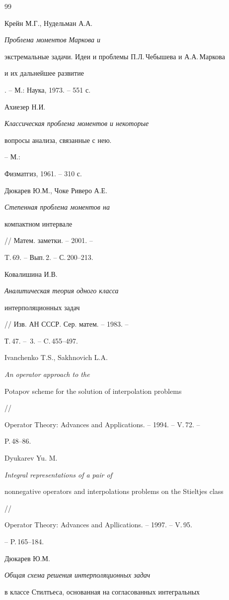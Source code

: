 \begin{thebibliography}{99}







Крейн М.Г., Нудельман А.А. {\em Проблема моментов Маркова и


экстремальные задачи. Идеи и проблемы П.Л.\,Чебышева и А.А.\,Маркова


и их дальнейшее развитие}. -- М.: Наука, 1973. -- 551 с.




Ахиезер Н.И. {\em Классическая проблема моментов и некоторые


вопросы анализа, связанные с нею.} -- М.:


Физматгиз, 1961. -- 310 с.




Дюкарев Ю.М., Чоке Риверо А.Е. {\em Степенная проблема моментов на


компактном интервале} // Матем. заметки. -- 2001. --


T.\,69. -- Вып.\,2. -- С.\,200--213.




Ковалишина И.В. {\em Аналитическая теория одного класса


интерполяционных задач} // Изв. АН СССР. Сер. матем. -- 1983. --


Т.\,47. -- \No\,3. -- C.\,455--497.




Ivanchenko T.S., Sakhnovich L.A. {\em An operator approach to the


Potapov scheme for the solution of interpolation problems} //


Operator Theory: Advances and Applications. -- 1994. -- V.\,72. --


P.\,48--86.




Dyukarev Yu. M. {\em Integral representations of a pair of


nonnegative operators and interpolations problems on the Stieltjes class} //


Operator Theory: Advances and Apllications. -- 1997. -- V.\,95.


-- P.\,165--184.




Дюкарев Ю.М. {\em Общая схема решения интерполяционных задач


в классе Стилтьеса, основанная на согласованных интегральных


}
\end{thebibliography}
